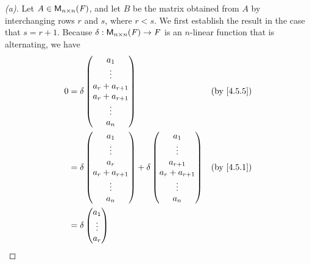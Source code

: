 \begin{proof}[(a)]
	Let \(A \in \ms[n][n][\F]\), and let \(B\) be the matrix obtained from \(A\) by interchanging rows \(r\) and \(s\), where \(r < s\).
	We first establish the result in the case that \(s = r + 1\).
	Because \(\delta : \ms[n][n][\F] \to \F\) is an \(n\)-linear function that is alternating, we have
	\begin{align*}
		0 & = \delta\begin{pmatrix}
			            a_1             \\
			            \vdots          \\
			            a_r + a_{r + 1} \\
			            a_r + a_{r + 1} \\
			            \vdots          \\
			            a_n
		            \end{pmatrix}               &  & \by{4.5.5}                                                     \\
		  & = \delta\begin{pmatrix}
			            a_1             \\
			            \vdots          \\
			            a_r             \\
			            a_r + a_{r + 1} \\
			            \vdots          \\
			            a_n
		            \end{pmatrix} + \delta\begin{pmatrix}
			                                  a_1             \\
			                                  \vdots          \\
			                                  a_{r + 1}       \\
			                                  a_r + a_{r + 1} \\
			                                  \vdots          \\
			                                  a_n
		                                  \end{pmatrix} &  & \by{4.5.1}                                             \\
		  & = \delta\begin{pmatrix}
			            a_1    \\
			            \vdots \\
			            a_r    \\

\end{pmatrix}
\end{align*}
\end{proof}
